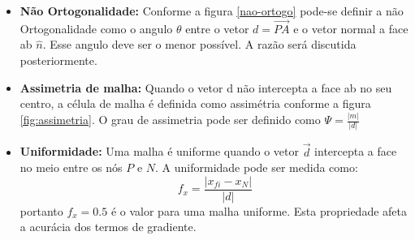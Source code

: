 \begin{itemize}
    \item \textbf{Não Ortogonalidade:} Conforme a figura \ref{nao-ortogo} pode-se definir a não Ortogonalidade como o angulo $\theta$ entre o vetor $d=\vec{PA}$ e o vetor normal a face ab $\hat{n}$. Esse angulo deve ser o menor possível. A razão será discutida posteriormente.
    \item \textbf{Assimetria de malha:} Quando o vetor d não intercepta a face ab no seu centro, a célula de malha é definida como assimétria conforme a figura \ref{fig:assimetria}. O grau de assimetria pode ser definido como $\Psi = \frac{|m|}{|d|}$
    \item \textbf{Uniformidade:}  Uma malha é uniforme quando o vetor $\vec{d}$ intercepta a face no meio entre os nós $P$ e $N$. A uniformidade pode ser medida como:
    \begin{equation*}
        f_x = \frac{|x_{fi}-x_N|}{|d|}
    \end{equation*}
    portanto $f_x=0.5$ é o valor para uma malha uniforme. Esta propriedade afeta a acurácia dos termos de gradiente.
\end{itemize}


